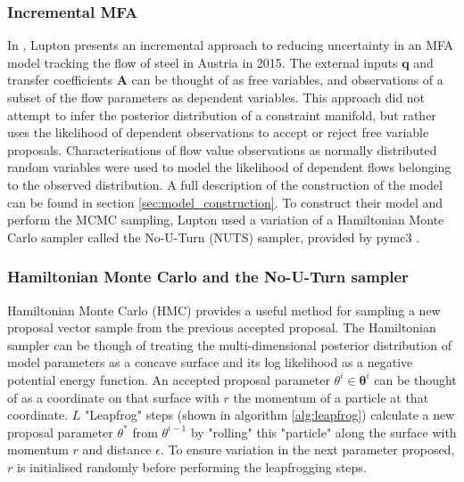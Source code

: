 \documentclass[ %
                    author={Tom Jager},
                supervisor={Dr. Daniel Schien},
                    degree={MEng},
                     title={A Bayesian Inference Engine for UMIS Structured Data},
                  subtitle={},
                      type={research},
                      year={2019} ]{dissertation}
\begin{document}
\subsubsection{Incremental MFA}
In \cite{lupton2018incremental}, Lupton presents an incremental approach to reducing uncertainty in an MFA model tracking the flow of steel in Austria in 2015. The external inputs $\bm{q}$ and transfer coefficients $\bm{A}$ can be thought of as free variables, and observations of a subset of the flow parameters as dependent variables. This approach did not attempt to infer the posterior distribution of a constraint manifold, but rather uses the likelihood of dependent observations to accept or reject free variable proposals. Characterisations of flow value observations as normally distributed random variables were used to model the likelihood of dependent flows belonging to the observed distribution. A full description of the construction of the model can be found in section \ref{sec:model_construction}. To construct their model and perform the MCMC sampling, Lupton used a variation of a Hamiltonian Monte Carlo sampler called the No-U-Turn (NUTS) sampler, provided by pymc3 \cite{salvatier2016probabilistic}.


\subsubsection{Hamiltonian Monte Carlo and the No-U-Turn sampler}
Hamiltonian Monte Carlo (HMC) \cite{betancourt2017conceptual} provides a useful method for sampling a new proposal vector sample from the previous accepted proposal. The Hamiltonian sampler can be though of treating the multi-dimensional posterior distribution of model parameters as a concave surface and its log likelihood as a negative potential energy function. An accepted proposal parameter $\theta^i \in \bm{\theta}^i$ can be thought of as a coordinate on that surface with $r$ the momentum of a particle at that coordinate. $L$ "Leapfrog" steps (shown in algorithm \ref{alg:leapfrog}) calculate a new proposal parameter $\theta^{*}$ from $\theta^{i-1}$ by "rolling" this "particle" along the surface with momentum $r$ and distance $\epsilon$. To ensure variation in the next parameter proposed, $r$ is initialised randomly before performing the leapfrogging steps.
\end{document}
